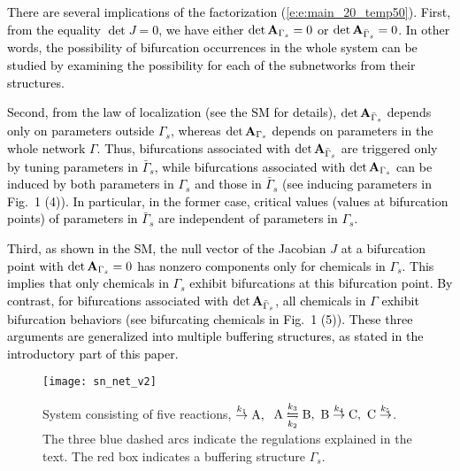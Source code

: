 \documentclass[ amsmath,amssymb,nofootinbib
]{revtex4-1}
\newcommand{\detA}{{\rm det}\,  {\bf A}}
\newcommand{\gs}{{\Gamma_s}}
\newcommand{\gbs}{{\bar{\Gamma}_s}}
\newcommand{\red}[1]{\textcolor{black}{#1}}
\newcommand{\corr}[1]{\textcolor{black}{#1}}
\begin{document}
\corr{
There are several implications of the factorization (\ref{e:e:main_20_temp50}). 
First, from the equality $\det J=0$, \red{we have either $\detA_{\Gamma_s}=0$ or  $\det {\bf A}_{\bar \Gamma_s}=0$.}  
In other words, the possibility of bifurcation occurrences in \red{the} whole system can be studied by examining the possibility for each of the subnetworks from their structures. } 

\corr{
Second, from the law of localization \red{(see the SM for details)}, $\detA_{\bar \Gamma_s}$ depends only on parameters outside $\Gamma_s$, whereas  $\detA_{\Gamma_s}$ depends on parameters in the whole network $\Gamma$. 
Thus, bifurcations associated with $\detA_\gbs$ are triggered only by tuning parameters in $\bar\Gamma_s$, while bifurcations associated with $\detA_\gs$ \red{can be}  induced by both parameters in $\gs$ and those in $\gbs$ \red{(see inducing parameters in Fig.~1 (4))}. In particular, in the former case, critical values (values at bifurcation points) of  parameters in $\gbs$ are independent of parameters in $\Gamma_s$. 
}

\corr{
Third,  as shown in the SM,  the null vector of the Jacobian $J$ at  a bifurcation point with $\detA_\gs=0$ has  nonzero components only for  chemicals in $\Gamma_s$. This implies that only chemicals in $\Gamma_s$  exhibit bifurcations at this bifurcation point. By contrast,  
\red{for} bifurcations associated with $\detA_\gbs$,  all chemicals in $\Gamma$  exhibit bifurcation behaviors \red{(see bifurcating chemicals in Fig.~1 (5))}. These three arguments are generalized into multiple buffering structures, as stated in the introductory part of this paper. 
}

 \vspace{-0.3cm}
\begin{figure}[!htb]
\texttt{[image: sn\_net\_v2]}
\caption{ System consisting of five reactions, $\overset{k_1}{\rightarrow }{\rm A}, $ $\ {\rm A} \underset{k_2}{\overset{k_3}{\leftrightharpoons}} {\rm B}, \ {\rm B} \overset{k_4}{\rightarrow}{\rm C}, \ {\rm C} \overset{k_5}{\rightarrow}$. 
The three blue dashed arcs indicate {the regulations explained in the text}.
The red box indicates a buffering structure {$\Gamma_s$}. 
  }
\label{fig:sn_net}
\end{figure}
\end{document}
